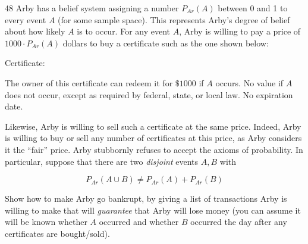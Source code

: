 \newpage

\begin{exercise}{48}
    Arby has a belief system assigning a number $P_{Ar}(A)$ between 0 and 1 to every event $A$ (for some sample space).
    This represents Arby's degree of belief about how likely $A$ is to occur.
    For any event $A$, Arby is willing to pay a price of $1000\cdot P_{Ar}(A)$ dollars to buy a certificate such as the one shown below:

    \begin{mdframed}
    Certificate:

    The owner of this certificate can redeem it for $\$ 1000$ if $A$ occurs.
    No value if $A$ does not occur, except as required by federal, state, or local law.
    No expiration date.
    \end{mdframed}

    Likewise, Arby is willing to sell such a certificate at the same price.
    Indeed, Arby is willing to buy or sell any number of certificates at this price, as Arby considers it the ``fair'' price.
    Arby stubbornly refuses to accept the axioms of probability.
    In particular, suppose that there are two \textit{disjoint} events $A, B$ with

    \[P_{Ar}(A \cup B) \neq P_{Ar}(A) + P_{Ar}(B)\]

    Show how to make Arby go bankrupt, by giving a list of transactions Arby is willing to make that will \textit{guarantee} that Arby will lose money (you can assume it will be known whether $A$ occurred and whether $B$ occurred the day after any certificates are bought/sold).
\end{exercise}

